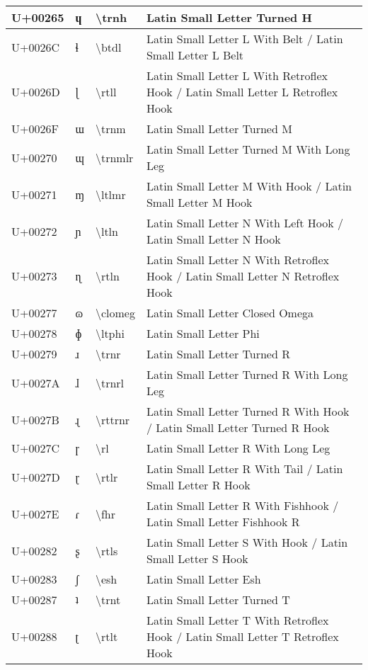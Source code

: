 \begin{table}[h]
\begin{tabulary}{\linewidth}{|L|L|L|L|}
\hline
U+00265 & ɥ & {\textbackslash}trnh & Latin Small Letter Turned H \\
\hline
U+0026C & ɬ & {\textbackslash}btdl & Latin Small Letter L With Belt / Latin Small Letter L Belt \\
\hline
U+0026D & ɭ & {\textbackslash}rtll & Latin Small Letter L With Retroflex Hook / Latin Small Letter L Retroflex Hook \\
\hline
U+0026F & ɯ & {\textbackslash}trnm & Latin Small Letter Turned M \\
\hline
U+00270 & ɰ & {\textbackslash}trnmlr & Latin Small Letter Turned M With Long Leg \\
\hline
U+00271 & ɱ & {\textbackslash}ltlmr & Latin Small Letter M With Hook / Latin Small Letter M Hook \\
\hline
U+00272 & ɲ & {\textbackslash}ltln & Latin Small Letter N With Left Hook / Latin Small Letter N Hook \\
\hline
U+00273 & ɳ & {\textbackslash}rtln & Latin Small Letter N With Retroflex Hook / Latin Small Letter N Retroflex Hook \\
\hline
U+00277 & ɷ & {\textbackslash}clomeg & Latin Small Letter Closed Omega \\
\hline
U+00278 & ɸ & {\textbackslash}ltphi & Latin Small Letter Phi \\
\hline
U+00279 & ɹ & {\textbackslash}trnr & Latin Small Letter Turned R \\
\hline
U+0027A & ɺ & {\textbackslash}trnrl & Latin Small Letter Turned R With Long Leg \\
\hline
U+0027B & ɻ & {\textbackslash}rttrnr & Latin Small Letter Turned R With Hook / Latin Small Letter Turned R Hook \\
\hline
U+0027C & ɼ & {\textbackslash}rl & Latin Small Letter R With Long Leg \\
\hline
U+0027D & ɽ & {\textbackslash}rtlr & Latin Small Letter R With Tail / Latin Small Letter R Hook \\
\hline
U+0027E & ɾ & {\textbackslash}fhr & Latin Small Letter R With Fishhook / Latin Small Letter Fishhook R \\
\hline
U+00282 & ʂ & {\textbackslash}rtls & Latin Small Letter S With Hook / Latin Small Letter S Hook \\
\hline
U+00283 & ʃ & {\textbackslash}esh & Latin Small Letter Esh \\
\hline
U+00287 & ʇ & {\textbackslash}trnt & Latin Small Letter Turned T \\
\hline
U+00288 & ʈ & {\textbackslash}rtlt & Latin Small Letter T With Retroflex Hook / Latin Small Letter T Retroflex Hook \\

\end{tabulary}
\end{table}

